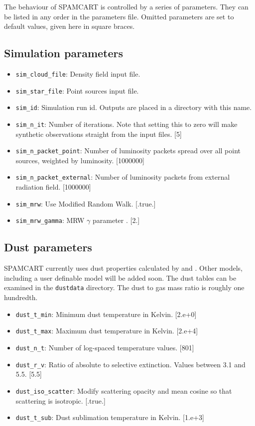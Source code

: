 \documentclass[11pt]{article}
\begin{document}
The behaviour of SPAMCART is controlled by a series of parameters. They can be listed in any order in the parameters file. Omitted parameters are set to default values, given here in square braces.

\subsection{Simulation parameters}

\begin{itemize}

	\item \texttt{sim\_cloud\_file}: Density field input file.
	\item \texttt{sim\_star\_file}: Point sources input file.
	\item \texttt{sim\_id}: Simulation run id. Outputs are placed in a directory with this name.
	\item \texttt{sim\_n\_it}: Number of iterations. Note that setting this to zero will make synthetic observations straight from the input files. [5]
	\item \texttt{sim\_n\_packet\_point}: Number of luminosity packets spread over all point sources, weighted by luminosity. [1000000]
	\item \texttt{sim\_n\_packet\_external}: Number of luminosity packets from external radiation field. [1000000]
	\item \texttt{sim\_mrw}: Use \citet{R10} Modified Random Walk. [.true.]
	\item \texttt{sim\_mrw\_gamma}: MRW $\gamma$ parameter \citep[see][]{R10}. [2.]

\end{itemize}

\subsection{Dust parameters}

SPAMCART currently uses dust properties calculated by \citet{LD01} and \citet{WD01}. Other models, including a user definable model will be added soon. The dust tables can be examined in the \texttt{dustdata} directory. The dust to gas mass ratio is roughly one hundredth.

\begin{itemize}

	\item \texttt{dust\_t\_min}: Minimum dust temperature in Kelvin. [2.e+0]
	\item \texttt{dust\_t\_max}: Maximum dust temperature in Kelvin. [2.e+4]
	\item \texttt{dust\_n\_t}: Number of log-spaced temperature values. [801]
	\item \texttt{dust\_r\_v}: Ratio of absolute to selective extinction. Values between 3.1 and 5.5. [5.5]
	\item \texttt{dust\_iso\_scatter}: Modify scattering opacity and mean cosine so that scattering is isotropic. [.true.]
	\item \texttt{dust\_t\_sub}: Dust sublimation temperature in Kelvin. [1.e+3]
	
\end{itemize}
\end{document}
